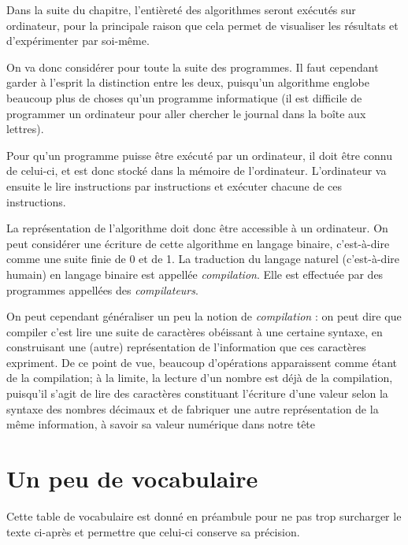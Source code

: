 \documentclass[../../main.tex]{subfiles}
\begin{document}
Dans la suite du chapitre, l'entièreté des algorithmes seront exécutés sur ordinateur, pour la principale raison que cela permet de visualiser les résultats et d'expérimenter par soi-même.

On va donc considérer pour toute la suite des programmes. Il faut cependant garder à l'esprit la distinction entre les deux, puisqu'un algorithme englobe beaucoup plus de choses qu'un programme informatique (il est difficile de programmer un ordinateur pour aller chercher le journal dans la boîte aux lettres).

Pour qu'un programme puisse être exécuté par un ordinateur, il doit être connu de celui-ci, et est donc stocké dans la mémoire de l'ordinateur. L'ordinateur va ensuite le lire instructions par instructions et exécuter chacune de ces instructions.

La représentation de l'algorithme doit donc être accessible à un ordinateur. On peut considérer une écriture de cette algorithme en langage binaire, c'est-à-dire comme une suite finie de 0 et de 1. La traduction du langage naturel (c'est-à-dire humain) en langage binaire est appellée \textit{compilation}. Elle est effectuée par des programmes appellées des \textit{compilateurs}.

On peut cependant généraliser un peu la notion de \textit{compilation} : on peut dire que compiler c'est lire une suite de caractères obéissant à une certaine syntaxe, en construisant une (autre) représentation de l'information que ces caractères expriment. De ce point
de vue, beaucoup d'opérations apparaissent comme étant de la compilation; à la limite, la lecture d'un nombre est déjà de la compilation, puisqu'il s'agit de lire des caractères constituant l'écriture d'une valeur selon la syntaxe des nombres décimaux et de fabriquer une autre représentation de la même information, à savoir sa valeur numérique \og dans notre tête \fg
\section{Un peu de vocabulaire} \label{sec:un_peu_de_vocabulaire}
Cette table de vocabulaire est donné en préambule pour ne pas trop surcharger le texte ci-après et permettre que celui-ci conserve sa précision.

\end{document}
